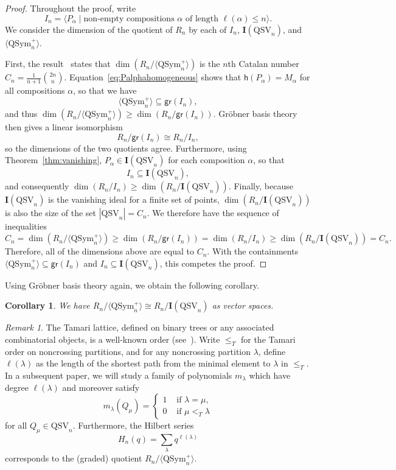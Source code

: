 \documentclass[12pt]{amsart}
\newtheorem{cor}[equation]{Corollary}
\theoremstyle{definition}
\theoremstyle{remark}
\newtheorem{rem}[equation]{Remark}
\numberwithin{equation}{section}
\newcommand{\QSym}{\mathrm{QSym}}
\newcommand{\QSV}{\mathrm{QSV}}
\begin{document}
\begin{proof}
Throughout the proof, write
\[
I_{n} = \langle P_{\alpha} \;|\; \text{non-empty compositions $\alpha$ of length $\ell(\alpha) \le n$} \rangle.
\]
We consider the dimension of the quotient of $R_{n}$ by each of $I_{n}$, $\mathbf{I}(\QSV_{n})$, and $\langle \QSym_{n}^{+} \rangle$.

First, the result~\cite[Theorem 1.1]{ABB} states that $\dim(R_n\big/\langle \QSym_{n}^{+} \rangle)$ is the $n$th Catalan number $C_{n} = \frac{1}{n+1} \binom{2n}{n}$.  Equation~\eqref{eq:Palphahomogeneous} shows that $\mathsf{h}(P_{\alpha}) = M_{\alpha}$ for all compositions $\alpha$, so that we have
\[
\langle \QSym_{n}^{+} \rangle \subseteq \mathsf{gr}(I_{n}),
\]
and thus $ \dim(R_n\big/\langle \QSym_{n}^{+} \rangle) \ge \dim(R_n\big/\mathsf{gr}(I_n))$.  
Gr\"{o}bner basis theory then gives a linear isomorphism
\[
R_{n} \big/ \mathsf{gr}(I_{n}) \cong R_{n}\big/I_{n},
\]
so the dimensions of the two quotients agree.  
Furthermore, using Theorem~\ref{thm:vanishing}, $P_{\alpha} \in \mathbf{I}(\QSV_{n})$ for each composition $\alpha$, so that
\[
I_{n} \subseteq \mathbf{I}(\QSV_{n}),
\]
and consequently $ \dim(R_n\big/I_n) \ge \dim(R_n\big/\mathbf{I}(\QSV_{n})) $.
Finally, because $\mathbf{I}(\QSV_{n})$ is the vanishing ideal for a finite set of points, $\dim(R_{n}\big/\mathbf{I}(\QSV_{n}))$ is also the size of the set $|\QSV_{n}| = C_{n}$.  We therefore have the sequence of inequalities
\[
C_{n} = \dim(R_n\big/\langle \QSym_{n}^{+} \rangle) \ge \dim(R_n\big/\mathsf{gr}(I_n)) =  \dim(R_n\big/I_n) \ge \dim(R_n \big/ \mathbf{I}(\QSV_{n})) = C_{n}.
\]
Therefore, all of the dimensions above are equal to $C_{n}$.  With the containments $\langle \QSym_{n}^{+} \rangle \subseteq \mathsf{gr}(I_{n})$ and $I_{n} \subseteq \mathbf{I}(\QSV_{n})$, this competes the proof.
\end{proof}

Using Gr\"{o}bner basis theory again, we obtain the following corollary.

\begin{cor}
We have $R_n\big/\langle \QSym_{n}^{+} \rangle \cong R_n\big/\mathbf{I}(\QSV_{n})$ as vector spaces.
\end{cor}

\begin{rem}
The Tamari lattice, defined on binary trees or any associated combinatorial objects, is a well-known order (see~\cite{Tamari}). 
Write $\le_{T}$ for the Tamari order on noncrossing partitions, and for any noncrossing partition $\lambda$, define $\ell(\lambda)$ as the length of the shortest path from the minimal element to $\lambda$ in $\le_{T}$. 
In a subsequent paper, we will study a family of polynomials $m_\lambda$ which have degree $\ell(\lambda)$ and moreover satisfy
  $$ m_\lambda(Q_\mu)=\begin{cases}1&\text{ if }\lambda=\mu,\\ 0 &\text{ if  } \mu<_{T} \lambda \end{cases}$$
for all $Q_\mu\in \QSV_n$.  Furthermore, the Hilbert series
$$H_n(q) = \sum_{\lambda} q^{\ell(\lambda)}$$
corresponds to the (graded) quotient $R_n\big/\langle \QSym_{n}^{+} \rangle$.
\end{rem}
\end{document}
